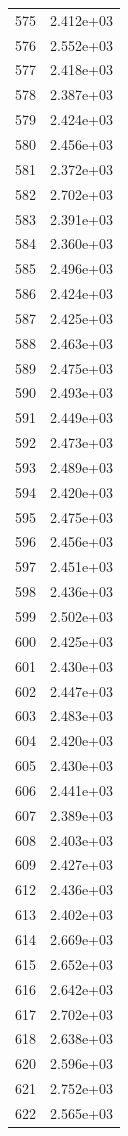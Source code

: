 \documentclass[12pt]{article}
\begin{document}
\begin{longtable}{@{}cc@{}}
575 & 2.412e+03 \\
576 & 2.552e+03 \\
577 & 2.418e+03 \\
578 & 2.387e+03 \\
579 & 2.424e+03 \\
580 & 2.456e+03 \\
581 & 2.372e+03 \\
582 & 2.702e+03 \\
583 & 2.391e+03 \\
584 & 2.360e+03 \\
585 & 2.496e+03 \\
586 & 2.424e+03 \\
587 & 2.425e+03 \\
588 & 2.463e+03 \\
589 & 2.475e+03 \\
590 & 2.493e+03 \\
591 & 2.449e+03 \\
592 & 2.473e+03 \\
593 & 2.489e+03 \\
594 & 2.420e+03 \\
595 & 2.475e+03 \\
596 & 2.456e+03 \\
597 & 2.451e+03 \\
598 & 2.436e+03 \\
599 & 2.502e+03 \\
600 & 2.425e+03 \\
601 & 2.430e+03 \\
602 & 2.447e+03 \\
603 & 2.483e+03 \\
604 & 2.420e+03 \\
605 & 2.430e+03 \\
606 & 2.441e+03 \\
607 & 2.389e+03 \\
608 & 2.403e+03 \\
609 & 2.427e+03 \\
612 & 2.436e+03 \\
613 & 2.402e+03 \\
614 & 2.669e+03 \\
615 & 2.652e+03 \\
616 & 2.642e+03 \\
617 & 2.702e+03 \\
618 & 2.638e+03 \\
620 & 2.596e+03 \\
621 & 2.752e+03 \\
622 & 2.565e+03 \\

\end{longtable}
\end{document}

